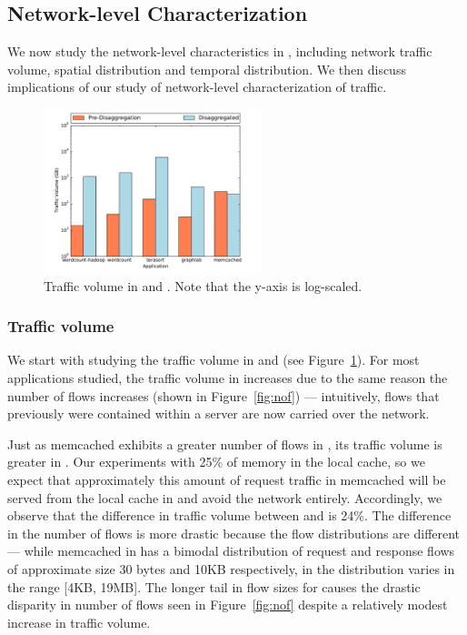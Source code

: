 \subsection{Network-level Characterization} 
\label{ssec:nlc}
We now study the network-level characteristics in \dis, including network traffic volume, spatial distribution and temporal distribution. We then discuss implications of our study of network-level characterization of \dis traffic.

%
\begin{figure}
  \centering
    \includegraphics[width = 2.5in]{img/graph5_trafficvolume} 
  \caption{\small{Traffic volume in \dis and \pdis. Note that the y-axis is log-scaled.}}
  \label{fig:vol}
\end{figure}
%
\subsubsection{Traffic volume}
\label{sssec:tfvol}
We start with studying the traffic volume in \dis and \pdis (see Figure~\ref{fig:vol}). For most applications studied, the traffic volume in \dis increases due to the same reason the number of flows increases (shown in Figure~\ref{fig:nof}) --- intuitively, flows that previously were contained within a server are now carried over the network.

Just as memcached exhibits a greater number of flows in \pdis, its traffic volume is greater in \dis. Our experiments with 25\% of memory in the local cache, so we expect that approximately this amount of request traffic in memcached will be served from the local cache in \dis and avoid the network entirely. Accordingly, we observe that the difference in traffic volume between \dis and \pdis is 24\%. The difference in the number of flows is more drastic because the flow distributions are different --- while memcached in \pdis has a bimodal distribution of request and response flows of approximate size 30 bytes and 10KB respectively, in \dis the distribution varies in the range [4KB, 19MB]. The longer tail in flow sizes for \dis causes the drastic disparity in number of flows seen in Figure~\ref{fig:nof} despite a relatively modest increase in traffic volume.

